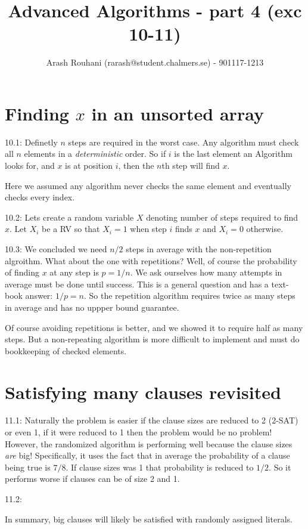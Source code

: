 \documentclass[a4paper,11pt]{article}
\title{Advanced Algorithms - part 4 (exc 10-11)}
\author{Arash Rouhani (rarash@student.chalmers.se) - 901117-1213}
\begin{document}
\maketitle

\section{Finding $x$ in an unsorted array}

10.1: Definetly $n$ steps are required in the worst case.
Any algorithm must check all $n$ elements in a \emph{deterministic} order.
So if $i$ is the last element an Algorithm looks for, and $x$ is at position
$i$, then the $n$th step will find $x$.

Here we assumed any algorithm never checks the same element and eventually
checks every index.

10.2: Lets create a random variable $X$ denoting number of steps
required to find $x$. Let $X_i$ be a RV so that $X_i = 1$
when step $i$ finds $x$ and $X_i = 0$ otherwise.



10.3: We concluded we need $n/2$ steps in average with the
non-repetition algroithm. What about the one with repetitions?
Well, of course the probability of finding $x$ at any step is
$p = 1/n$. We ask ourselves how many attempts in average must
be done until success. This is a general question and has a
text-book answer: $1/p = n$. So the repetition algorithm
requires twice as many steps in average and has no
uppper bound guarantee.

Of course avoiding repetitions is better, and we showed
it to require half as many steps. But a non-repeating
algorithm is more difficult to implement and must do bookkeeping
of checked elements.

\section{Satisfying many clauses revisited}

11.1: Naturally the problem is easier if the clause sizes
are reduced to 2 (2-SAT) or even 1, if it were reduced to 1
then the problem would be no problem!
However, the randomized algorithm is performing well
because the clause sizes \emph{are} big! Specifically, it uses
the fact that in average the probability of a clause
being true is $7/8$. If clause sizes was 1 that
probability is reduced to $1/2$. So it performs worse
if clauses can be of size 2 and 1.

11.2:

In summary, big clauses will likely be satisfied with
randomly assigned literals.
\end{document}
